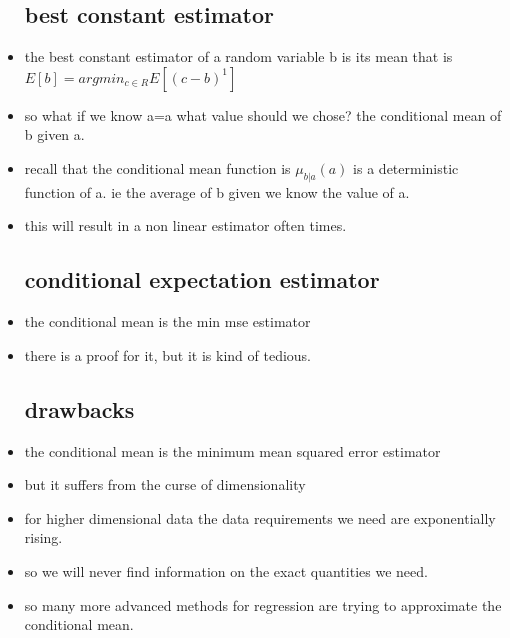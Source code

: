 \documentclass{article}
\begin{document}
\begin{itemize}
\subsection{best constant estimator}
\item the best constant estimator of a random variable b is its mean that is $E[b]=argmin_{c \in R}E[(c-b)^1]$
\item so what if we know a=a what value should we chose? the conditional mean of b given a. 
\item recall that the conditional mean function is $\mu_{b|a}(a)$ is a deterministic function of a. ie the average of b given we know the value of a. 
\item this will result in a non linear estimator often times. 
\subsection{conditional expectation estimator}
\item the conditional mean is the min mse estimator 
\item there is a proof for it, but it is kind of tedious.
\subsection{drawbacks}
\item the conditional mean is the minimum mean squared error estimator
\item but it suffers from the curse of dimensionality
\item for higher dimensional data the data requirements we need are exponentially rising. 
\item so we will never find information on the exact quantities we need. 
\item so many more advanced methods for regression are trying to approximate the conditional mean. 
\end{itemize}
\end{document}
